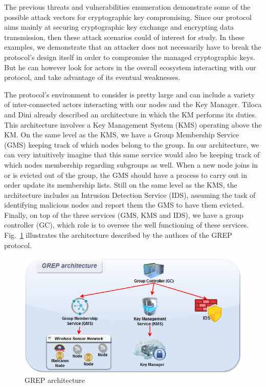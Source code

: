 The previous threats and vulnerabilities enumeration demonstrate some of the possible attack vectors for cryptographic key compromising. Since our protocol aims mainly at securing cryptographic key exchange and encrypting data transmission, then these attack scenarios could of interest for study. In these examples, we demonstrate that an attacker does not necessarily have to break the protocol’s design itself in order to compromise the managed cryptographic keys. But he can however look for actors in the overall ecosystem interacting with our protocol, and take advantage of its eventual weaknesses.

The protocol’s environment to consider is pretty large and can include a variety of inter-connected actors interacting with our nodes and the Key Manager. Tiloca and Dini \cite{tiloca_grep_2016} already described an architecture in which the KM performs its duties. This architecture involves a Key Management System (KMS) operating above the KM. On the same level as the KMS, we have a Group Membership Service (GMS) keeping track of which nodes belong to the group. In our architecture, we can very intuitively imagine that this same service would also be keeping track of which nodes membership regarding subgroups as well. When a new node joins in or is evicted out of the group, the GMS should have a process to carry out in order update its membership lists. Still on the same level as the KMS, the architecture includes an Intrusion Detection Service (IDS), assuming the task of identifying malicious nodes and report them the GMS to have them evicted. Finally, on top of the three services (GMS, KMS and IDS), we have a group controller (GC), which role is to oversee the well functioning of these services. Fig.~\ref{fig:grep} illustrates the architecture described by the authors of the GREP protocol.

\begin{figure}[htbp]
	\centerline{\includegraphics[scale=0.60]{figures/mgkmp/grep.png}}
	\caption{GREP architecture}
	\label{fig:grep}
\end{figure}

